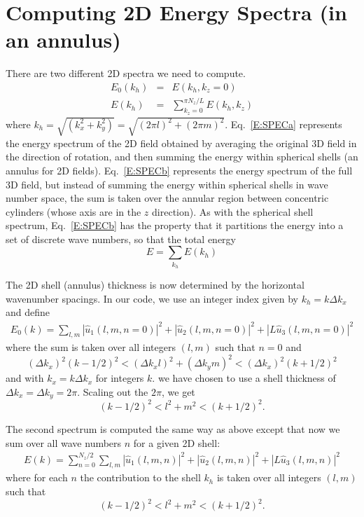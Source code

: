 \documentclass[12pt]{article}
\begin{document}
\section{Computing 2D Energy Spectra (in an annulus)}
There are two different 2D spectra we need to compute. 
\begin{eqnarray}
E_0(k_h) &=& E(k_h, k_z=0) 
\label{E:SPECa} \\
E(k_h) &=& \sum_{k_z=0}^{\pi N_z/L} E(k_h,k_z) 
\label{E:SPECb}
\end{eqnarray}
where $k_h = \sqrt{(k_x^2 + k_y^2)} = \sqrt{(2\pi l)^2 + (2\pi m)^2}$. 
Eq.~\ref{E:SPECa} represents the energy spectrum of the 2D field
obtained by averaging the original 3D field  in the direction of rotation,
and then summing the energy within spherical shells (an annulus for 2D fields).  
Eq.~\ref{E:SPECb} represents
the energy spectrum of the full 3D field, but instead of 
summing the energy within spherical shells in wave number space, the sum is
taken over the annular region between concentric cylinders
(whose axis are in the $z$ direction).  As with the spherical
shell spectrum, Eq.~\ref{E:SPECb} has the property that
it partitions the energy into a set of discrete wave numbers, so
that the total energy 
\[
E = \sum_{k_h} E(k_h)
\]


The 2D shell (annulus) thickness is now
determined by the horizontal wavenumber spacings. In our code,
we use an integer index given by $k_h = k \Delta k_x$ and
define
\begin{eqnarray*}
E_0(k) = \sum_{l,m}  |  {\hat u_1}(l,m,n=0) |^2 +
 |  {\hat u_2}(l,m,n=0) |^2 + 
 |  L {\hat u_3}(l,m,n=0) |^2
\end{eqnarray*}
where the sum is taken over all integers $(l,m)$ such that $n=0$ and
\[
(\Delta k_x)^2 (k-1/2)^2 < (\Delta k_x l)^2 + (\Delta k_y m)^2  <  (\Delta k_x)^2 (k+1/2)^2 
\]
and with $k_x=k \Delta k_x$ for integers $k$.  
we have chosen to use a shell thickness of $\Delta k_x = \Delta
k_y = 2\pi$. Scaling out the $2\pi$, we get
\[
(k-1/2)^2 < l^2 + m^2 < (k+1/2)^2.
\]  

The second spectrum is computed the same way as above except that now
we sum over all wave numbers $n$ for a given 2D shell:
\begin{eqnarray}
E(k) = \sum_{n=0}^{N_z/2} \sum_{l,m} |  {\hat u_1}(l,m,n) |^2 +
 |  {\hat u_2}(l,m,n) |^2 + 
 |  L {\hat u_3}(l,m,n) |^2
\end{eqnarray}
where for each $n$ the contribution to the shell $k_h$ is 
taken over all integers $(l,m)$ such that
\[
(k-1/2)^2 < l^2 + m^2 < (k+1/2)^2.
\]  
\end{document}
